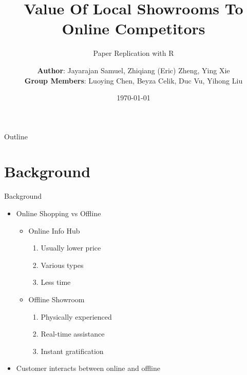 \documentclass[mathserif, xcolor=table]{beamer}
\title{Value Of Local Showrooms To Online Competitors}
\subtitle{Paper Replication with R}
\author{\textbf{Author}: Jayarajan Samuel, Zhiqiang (Eric) Zheng, Ying Xie \\ 
{\footnotesize \textbf{Group Members}: Luoying Chen, Beyza Celik, Duc Vu, Yihong Liu }}
\institute[] %
{  
%  
%  
}
\date{\today}
\begin{document}
\begin{frame}
  \titlepage
\end{frame}

\begin{frame}[allowframebreaks]{Outline}
  \tableofcontents
\end{frame}

\section{Background}
\begin{frame}[allowframebreaks]{Background}
	\begin{itemize}
		\item Online Shopping vs Offline
		\begin{multicols}{2}
			\begin{itemize}
				\item Online Info Hub
				\begin{enumerate}
					\item Usually lower price
					\item Various types
					\item Less time
				\end{enumerate}
				\item Offline Showroom
				\begin{enumerate}
					\item Physically experienced
					\item Real-time assistance
					\item Instant gratification
				\end{enumerate}
			\end{itemize}
		\end{multicols}
		\item Customer interacts between online and offline
	\end{itemize}
	\framebreak
	\begin{figure}[h]
		\centering

\end{figure}
\end{frame}
\end{document}
